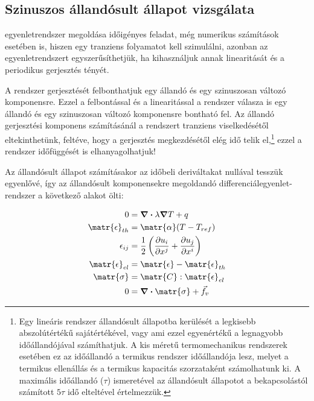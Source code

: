 \subsection{Szinuszos állandósult állapot vizsgálata}
\label{sec:sinusoidal}

 egyenletrendszer megoldása időigényes feladat, még numerikus számítások esetében is, hiszen egy tranziens folyamatot kell szimulálni, azonban az egyenletrendszert egyszerűsíthetjük, ha kihasználjuk annak linearitását és a periodikus gerjesztés tényét.

A rendszer gerjesztését felbonthatjuk egy állandó és egy szinuszosan változó komponensre. Ezzel a felbontással és a linearitással a rendszer válasza is egy állandó és egy szinuszosan változó komponensre bontható fel. Az állandó gerjesztési komponens számításánál a rendszert tranziens viselkedésétől eltekinthetünk, feltéve, hogy a gerjesztés megkezdésétől elég idő telik el,\footnote{Egy lineáris rendszer állandósult állapotba kerülését a legkisebb abszolútértékű sajátértékével, vagy ami ezzel egyenértékű a legnagyobb időállandójával számíthatjuk. A kis méretű termomechanikus rendszerek esetében ez az időállandó a termikus rendszer időállandója lesz, melyet a termikus ellenállás és a termikus kapacitás szorzataként számolhatunk ki. A maximális időállandó ($\tau$) ismeretével az állandósult állapotot a bekapcsolástól számított $5\tau$ idő elteltével értelmezzük.} ezzel a rendszer időfüggését is elhanyagolhatjuk!

Az állandósult állapot számításakor az időbeli deriváltakat nullával tesszük egyenlővé, így az állandósult komponensekre megoldandó differenciálegyenlet-rendszer a következő alakot ölti:

\begin{equation}\label{thermomechanical_eqs_stat}
    \begin{split}
        0 &= \div\lambda \grad T + q \\
        \matr{\epsilon}_{th} &= \matr{\alpha}(T-T_{ref}) \\
        \epsilon_{ij} &= \frac{1}{2}\left(\frac{\partial u_i}{\partial x^j}+\frac{\partial u_j}{\partial x^i}\right) \\
        \matr{\epsilon}_{el} &= \matr{\epsilon} - \matr{\epsilon}_{th} \\
        \matr{\sigma} &= \matr{C} : \matr{\epsilon}_{el} \\
        0 &= \div\matr{\sigma} + \vec{f}_v
    \end{split}
\end{equation}

